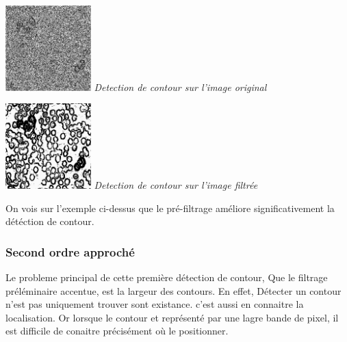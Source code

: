 \documentclass[a4,12pt]{article}
\begin{document}
\noindent
\begin{center}
\begin{minipage}[c]{0.20\linewidth}
	\begin{center}
		\includegraphics[width = 33mm]{./img/globulesbb26_mean.jpg}
		\textit{Detection de contour sur l'image original}
	\end{center}
\end{minipage}
\begin{minipage}[c]{0.20\linewidth}
	\begin{center}
		\includegraphics[width = 33mm]{./img/globulesbb26_filtrer3_mean.jpg}
		\textit{Detection de contour sur l'image filtrée}
	\end{center}
\end{minipage}
\end{center}

On vois sur l'exemple ci-dessus que le pré-filtrage améliore significativement la détéction de contour.\\

\subsubsection{Second ordre approché}
Le probleme principal de cette première détection de contour, Que le filtrage préléminaire accentue, est la largeur des contours.
En effet, Détecter un contour n'est pas uniquement trouver sont existance. c'est aussi en connaitre la localisation. Or lorsque le contour et représenté par une
lagre bande de pixel, il est difficile de conaitre précisément où le positionner.\\
\end{document}
